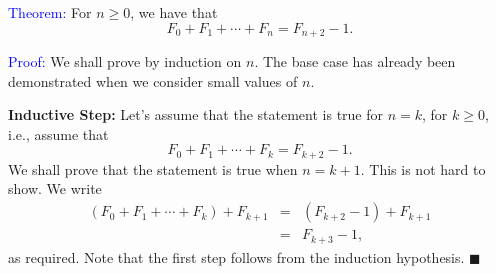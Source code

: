 \begin{frame}
  \textcolor{blue}{Theorem:} For $n\geq 0$, we have that \[ F_0+F_1+\cdots+F_n = F_{n+2}-1.\]

  \textcolor{blue}{Proof:} We shall prove by induction on $n$.  The
  base case has already been demonstrated when we consider small
  values of $n$.
  
  \vspace{0.1in}
  {\bf Inductive Step:} Let's assume that the statement is true for $n=k$, for $k\geq 0$, i.e., assume that
  \[ F_0+F_1+\cdots+F_k = F_{k+2}-1.\]
  We shall prove that the statement is true when $n=k+1$.  This is not
  hard to show.  We write
  \begin{eqnarray*}
    (F_0+F_1+\cdots+F_k)+F_{k+1} &=& (F_{k+2}-1) + F_{k+1} \\
    &=& F_{k+3} - 1,
  \end{eqnarray*}
  as required.  Note that the first step follows from the induction
  hypothesis. $\blacksquare$
\end{frame}
